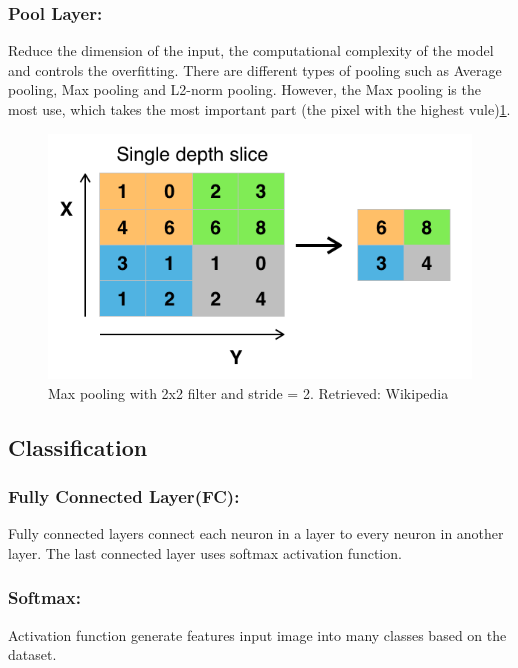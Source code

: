 \documentclass[12pt]{report}
\begin{document}
    \subsubsection{Pool Layer:}
        Reduce the dimension of the input, the computational complexity of the model and 
        controls the overfitting. There are different types of pooling such as Average pooling, Max pooling and L2-norm pooling.
        However, the Max pooling is the most use, which takes the most important part (the pixel with the highest vule)\ref{fig:pool}. 
        
            \begin{figure}[h]
                \centering
                \includegraphics[width=.8\textwidth]{./images/pool.png}
                \caption{Max pooling with 2x2 filter and stride = 2. Retrieved: Wikipedia}
                \label{fig:pool}
            \end{figure}

    \subsection{Classification}
        \subsubsection{Fully Connected Layer(FC):}
            Fully connected layers connect each neuron in a layer to every neuron in another layer.
            The last connected layer uses softmax activation function.
        \subsubsection{Softmax:}
            Activation function generate features input image into many classes based on the dataset.  
        
        \bigbreak
        \bigbreak
        
\end{document}
